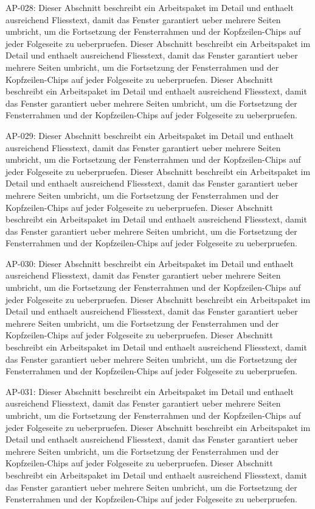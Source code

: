 \documentclass[type=report,theme=light,language=de]{semio}
\begin{document}
\begin{Table}[title=Lange Tabelle]
AP-028: Dieser Abschnitt beschreibt ein Arbeitspaket im Detail und enthaelt ausreichend Fliesstext, damit das Fenster garantiert ueber mehrere Seiten umbricht, um die Fortsetzung der Fensterrahmen und der Kopfzeilen-Chips auf jeder Folgeseite zu ueberpruefen. Dieser Abschnitt beschreibt ein Arbeitspaket im Detail und enthaelt ausreichend Fliesstext, damit das Fenster garantiert ueber mehrere Seiten umbricht, um die Fortsetzung der Fensterrahmen und der Kopfzeilen-Chips auf jeder Folgeseite zu ueberpruefen. Dieser Abschnitt beschreibt ein Arbeitspaket im Detail und enthaelt ausreichend Fliesstext, damit das Fenster garantiert ueber mehrere Seiten umbricht, um die Fortsetzung der Fensterrahmen und der Kopfzeilen-Chips auf jeder Folgeseite zu ueberpruefen. 

AP-029: Dieser Abschnitt beschreibt ein Arbeitspaket im Detail und enthaelt ausreichend Fliesstext, damit das Fenster garantiert ueber mehrere Seiten umbricht, um die Fortsetzung der Fensterrahmen und der Kopfzeilen-Chips auf jeder Folgeseite zu ueberpruefen. Dieser Abschnitt beschreibt ein Arbeitspaket im Detail und enthaelt ausreichend Fliesstext, damit das Fenster garantiert ueber mehrere Seiten umbricht, um die Fortsetzung der Fensterrahmen und der Kopfzeilen-Chips auf jeder Folgeseite zu ueberpruefen. Dieser Abschnitt beschreibt ein Arbeitspaket im Detail und enthaelt ausreichend Fliesstext, damit das Fenster garantiert ueber mehrere Seiten umbricht, um die Fortsetzung der Fensterrahmen und der Kopfzeilen-Chips auf jeder Folgeseite zu ueberpruefen. 

AP-030: Dieser Abschnitt beschreibt ein Arbeitspaket im Detail und enthaelt ausreichend Fliesstext, damit das Fenster garantiert ueber mehrere Seiten umbricht, um die Fortsetzung der Fensterrahmen und der Kopfzeilen-Chips auf jeder Folgeseite zu ueberpruefen. Dieser Abschnitt beschreibt ein Arbeitspaket im Detail und enthaelt ausreichend Fliesstext, damit das Fenster garantiert ueber mehrere Seiten umbricht, um die Fortsetzung der Fensterrahmen und der Kopfzeilen-Chips auf jeder Folgeseite zu ueberpruefen. Dieser Abschnitt beschreibt ein Arbeitspaket im Detail und enthaelt ausreichend Fliesstext, damit das Fenster garantiert ueber mehrere Seiten umbricht, um die Fortsetzung der Fensterrahmen und der Kopfzeilen-Chips auf jeder Folgeseite zu ueberpruefen. 

AP-031: Dieser Abschnitt beschreibt ein Arbeitspaket im Detail und enthaelt ausreichend Fliesstext, damit das Fenster garantiert ueber mehrere Seiten umbricht, um die Fortsetzung der Fensterrahmen und der Kopfzeilen-Chips auf jeder Folgeseite zu ueberpruefen. Dieser Abschnitt beschreibt ein Arbeitspaket im Detail und enthaelt ausreichend Fliesstext, damit das Fenster garantiert ueber mehrere Seiten umbricht, um die Fortsetzung der Fensterrahmen und der Kopfzeilen-Chips auf jeder Folgeseite zu ueberpruefen. Dieser Abschnitt beschreibt ein Arbeitspaket im Detail und enthaelt ausreichend Fliesstext, damit das Fenster garantiert ueber mehrere Seiten umbricht, um die Fortsetzung der Fensterrahmen und der Kopfzeilen-Chips auf jeder Folgeseite zu ueberpruefen. 


\end{Table}
\end{document}
